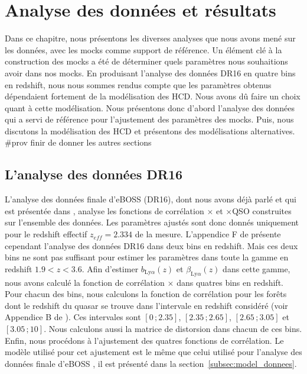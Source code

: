 \documentclass[11pt, twoside, a4paper, openright]{report}
\begin{document}

\graphicspath{ {../figures/mocks/} }

\chapter{Analyse des données et résultats}
\minitoc
\newpage
\thispagestyle{fancy}

Dans ce chapitre, nous présentons les diverses analyses que nous avons mené sur les données, avec les mocks comme support de référence.
Un élément clé à la construction des mocks a été de déterminer quels paramètres \lya{} nous souhaitions avoir dans nos mocks. En produisant l'analyse des données DR16 en quatre bins en redshift, nous nous sommes rendus compte que les paramètres \lya{} obtenus dépendaient fortement de la modélisation des HCD. Nous avons dû faire un choix quant à cette modélisation.
Nous présentons donc d'abord l'analyse des données qui a servi de référence pour l'ajustement des paramètres des mocks. Puis, nous discutons la modélisation des HCD et présentons des modélisations alternatives.
\#prov finir de donner les autres sections



\section{L'analyse des données DR16}
L'analyse des données finale d'eBOSS (DR16), dont nous avons déjà parlé et qui est présentée dans \citet{prov}, analyse les fonctions de corrélation \lya$\times$\lya{} et \lya{}$\times$QSO construites sur l'ensemble des données. Les paramètres ajustés sont donc donnés uniquement pour le redshift effectif $z_{eff} = \num{2.334}$ de la mesure. L'appendice F de \citet{prov} présente cependant l'analyse des données DR16 dans deux bins en redshift. Mais ces deux bins ne sont pas suffisant pour estimer les paramètres \lya{} dans toute la gamme en redshift $1.9 < z  < 3.6$.
Afin d'estimer $b_{\mathrm{Ly}\alpha}(z)$ et $\beta_{\mathrm{Ly}\alpha}(z)$ dans cette gamme, nous avons calculé la fonction de corrélation \lya{}$\times$\lya{} dans quatres bins en redshift.
Pour chacun des bins, nous calculons la fonction de corrélation pour les forêts dont le redshift du quasar se trouve dans l'intervale en redshift considéré (voir Appendice B de \citet{Agathe2019a}).
Ces intervales sont $[\num{0}\,;\num{2.35}]$, $[\num{2.35}\,;\num{2.65}]$, $[\num{2.65}\,;\num{3.05}]$ et $[\num{3.05}\,;\num{10}]$.
Nous calculons aussi la matrice de distorsion dans chacun de ces bins.
Enfin, nous procédons à l'ajustement des quatres fonctions de corrélation. Le modèle utilisé pour cet ajustement est le même que celui utilisé pour l'analyse des données finale d'eBOSS \citep{prov}, il est présenté dans la section~\ref{subsec:model_donnees}.





\end{document}
